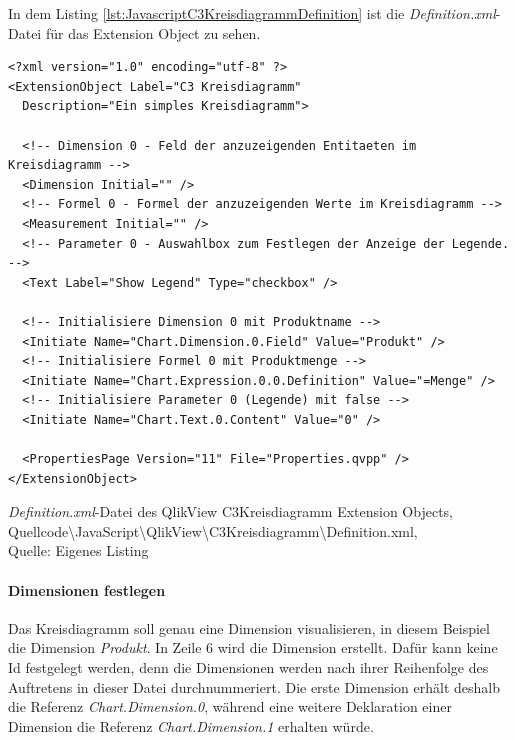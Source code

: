 In dem Listing \ref{lst:JavascriptC3KreisdiagrammDefinition} ist die \textit{Definition.xml}-Datei für das Extension Object zu sehen.


\begin{listing}[htbp]
\begin{verbatim}
<?xml version="1.0" encoding="utf-8" ?>
<ExtensionObject Label="C3 Kreisdiagramm"
  Description="Ein simples Kreisdiagramm">

  <!-- Dimension 0 - Feld der anzuzeigenden Entitaeten im Kreisdiagramm -->
  <Dimension Initial="" />
  <!-- Formel 0 - Formel der anzuzeigenden Werte im Kreisdiagramm -->
  <Measurement Initial="" />
  <!-- Parameter 0 - Auswahlbox zum Festlegen der Anzeige der Legende. -->
  <Text Label="Show Legend" Type="checkbox" />

  <!-- Initialisiere Dimension 0 mit Produktname -->
  <Initiate Name="Chart.Dimension.0.Field" Value="Produkt" />
  <!-- Initialisiere Formel 0 mit Produktmenge -->
  <Initiate Name="Chart.Expression.0.0.Definition" Value="=Menge" />
  <!-- Initialisiere Parameter 0 (Legende) mit false -->
  <Initiate Name="Chart.Text.0.Content" Value="0" />

  <PropertiesPage Version="11" File="Properties.qvpp" />
</ExtensionObject>
\end{verbatim}
\caption[\textit{Definition.xml}-Datei des QlikView C3Kreisdiagramm Extension Objects]{\textit{Definition.xml}-Datei des QlikView C3Kreisdiagramm Extension Objects, \\Quellcode\textbackslash{}JavaScript\textbackslash{}QlikView\textbackslash{}C3Kreisdiagramm\textbackslash{}Definition.xml, \\Quelle: Eigenes Listing}
\label{lst:JavascriptC3KreisdiagrammDefinition}
\end{listing}

\paragraph{Dimensionen festlegen}

Das Kreisdiagramm soll genau eine Dimension visualisieren, in diesem Beispiel die Dimension \textit{Produkt}. In Zeile 6 wird die Dimension erstellt. Dafür kann keine Id festgelegt werden, denn die Dimensionen werden nach ihrer Reihenfolge des Auftretens in dieser Datei durchnummeriert. Die erste Dimension erhält deshalb die Referenz \textit{Chart.Dimension.0}, während eine weitere Deklaration einer Dimension die Referenz \textit{Chart.Dimension.1} erhalten würde.

